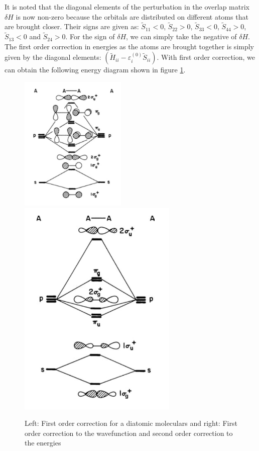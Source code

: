 \documentclass{article}
\newcommand{\order}[2]{#1^{(#2)}}
\begin{document}
It is noted that the diagonal elements of the perturbation in the overlap matrix 
$\delta H$ is now non-zero because the orbitals are distributed on different atoms 
that are brought closer. Their signs are given as:
$\tilde{S}_{11} < 0$, 
$\tilde{S}_{22} > 0$, 
$\tilde{S}_{33} < 0$, 
$\tilde{S}_{44} > 0$, 
$\tilde{S}_{13} < 0$ and 
$\tilde{S}_{24} > 0$. For the sign of $\delta H$, we can simply take the negative 
of $\delta H$. The first order correction in energies as the atoms are brought together 
is simply given by the diagonal elements: 
$(\tilde{H}_{ii} - \order{\varepsilon_i}{0} \tilde{S}_{ii})$. With first order correction, 
we can obtain the following energy diagram shown in figure \ref{F:A2_first_order}.
\begin{figure}[h!]
    \centering
    \includegraphics[width=2in]{F_A2_first_order.png}
    \includegraphics[width=3in]{F_A2_second_order.png}
    \caption{Left: First order correction for a diatomic moleculars and 
             right: First order correction to the wavefunction and second order correction to the energies}
    \label{F:A2_first_order}
\end{figure}
\end{document}
